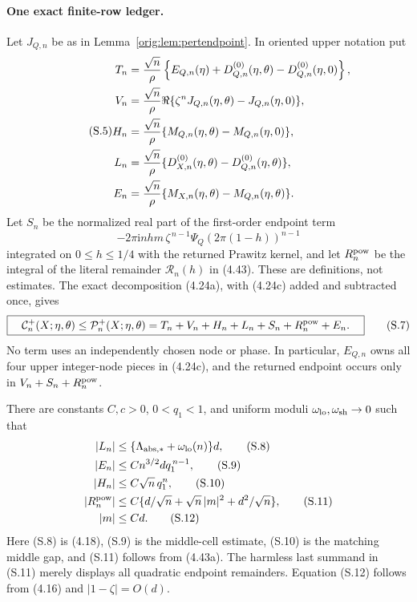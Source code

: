 \documentclass[11pt,a4paper]{article}
\numberwithin{equation}{section}
\theoremstyle{definition}
\theoremstyle{remark}
\newcommand{\ii}{\mathrm i}
\begin{document}
\paragraph{One exact finite-row ledger.}
Let \(J_{Q,n}\) be as in Lemma~\ref{orig:lem:pertendpoint}.  In oriented upper
notation put
\begin{equation}\tag{S.5}
\begin{aligned}
 T_n&={\sqrt n\over\rho}\left\{E_{Q,n}(\eta)
       +D^{(0)}_{Q,n}(\eta,\theta)-D^{(0)}_{Q,n}(\eta,0)\right\},\\
 V_n&={\sqrt n\over\rho}\Re\{\zeta^nJ_{Q,n}(\eta,\theta)
                                      -J_{Q,n}(\eta,0)\},\\
 H_n&={\sqrt n\over\rho}\{M_{Q,n}(\eta,\theta)
                                      -M_{Q,n}(\eta,0)\},\\
 L_n&={\sqrt n\over\rho}\{D^{(0)}_{X,n}(\eta,\theta)
                                      -D^{(0)}_{Q,n}(\eta,\theta)\},\\
 E_n&={\sqrt n\over\rho}\{M_{X,n}(\eta,\theta)
                                      -M_{Q,n}(\eta,\theta)\}.
\end{aligned}
\end{equation}
Let \(S_n\) be the normalized real part of the first-order endpoint term
\[
 -2\pi\ii nhm\,\zeta^{\,n-1}
       \Psi_Q(2\pi(1-h))^{n-1}                               \tag{S.6}
\]
integrated on \(0\le h\le1/4\) with the returned Prawitz kernel, and let
\(R_n^{\rm pow}\) be the integral of the literal remainder
\(\mathcal R_n(h)\) in (4.43).  These are definitions, not estimates.  The
exact decomposition (4.24a), with (4.24c) added and subtracted once, gives
\[
 \boxed{\quad
 \mathcal C_n^+(X;\eta,\theta)
 \le \mathcal P_n^+(X;\eta,\theta)
 =T_n+V_n+H_n+L_n+S_n+R_n^{\rm pow}+E_n .
 \quad}                                                       \tag{S.7}
\]
No term uses an independently chosen node or phase.  In particular,
\(E_{Q,n}\) owns all four upper integer-node pieces in (4.24c), and the
returned endpoint occurs only in \(V_n+S_n+R_n^{\rm pow}\).

There are constants \(C,c>0\), \(0<q_1<1\), and uniform moduli
\(\omega_{\rm lo},\omega_{\rm sh}\to0\) such that
\begin{align}
 |L_n|&\le\{\Lambda_{\rm abs,*}+\omega_{\rm lo}(n)\}d,
                                                               \tag{S.8}\\
 |E_n|&\le Cn^{3/2}d q_1^{\,n-1},                              \tag{S.9}\\
 |H_n|&\le C\sqrt n\,q_1^n,                                   \tag{S.10}\\
 |R_n^{\rm pow}|&\le
 C\{d/\sqrt n+\sqrt n\,|m|^2+d^2/\sqrt n\},                   \tag{S.11}\\
 |m|&\le C d.                                                  \tag{S.12}
\end{align}
Here (S.8) is (4.18), (S.9) is the middle-cell estimate, (S.10) is
the matching middle gap, and (S.11) follows from (4.43a).  The harmless
last summand in (S.11) merely displays all quadratic endpoint remainders.
Equation (S.12) follows from (4.16) and \(|1-\zeta|=O(d)\).
\end{document}
